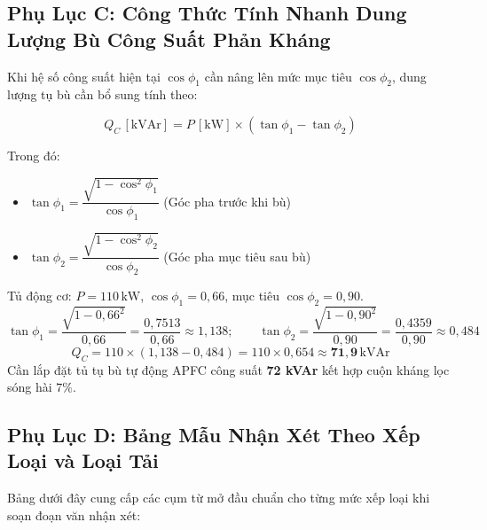 \documentclass[12pt,a4paper]{article}
\begin{document}
\subsection{Phụ Lục C: Công Thức Tính Nhanh Dung Lượng Bù Công Suất Phản Kháng}

Khi hệ số công suất hiện tại $\cos\phi_1$ cần nâng lên mức mục tiêu $\cos\phi_2$, dung lượng tụ bù cần bổ sung tính theo:

\begin{equation}
  Q_C\,[\mathrm{kVAr}] = P\,[\mathrm{kW}] \times \left(\tan\phi_1 - \tan\phi_2\right)
\end{equation}

Trong đó:
\begin{itemize}
  \item $\tan\phi_1 = \dfrac{\sqrt{1 - \cos^2\phi_1}}{\cos\phi_1}$ \quad (Góc pha trước khi bù)
  \item $\tan\phi_2 = \dfrac{\sqrt{1 - \cos^2\phi_2}}{\cos\phi_2}$ \quad (Góc pha mục tiêu sau bù)
\end{itemize}

\begin{techbox}[title=Ví Dụ Tính Bù Tụ Thực Tế]
Tủ động cơ: $P = 110\,\mathrm{kW}$, $\cos\phi_1 = 0{,}66$, mục tiêu $\cos\phi_2 = 0{,}90$.
\[
  \tan\phi_1 = \frac{\sqrt{1 - 0{,}66^2}}{0{,}66} = \frac{0{,}7513}{0{,}66} \approx 1{,}138; \qquad
  \tan\phi_2 = \frac{\sqrt{1 - 0{,}90^2}}{0{,}90} = \frac{0{,}4359}{0{,}90} \approx 0{,}484
\]
\[
  Q_C = 110 \times (1{,}138 - 0{,}484) = 110 \times 0{,}654 \approx \mathbf{71{,}9\,\mathrm{kVAr}}
\]
Cần lắp đặt tủ tụ bù tự động APFC công suất \textbf{72 kVAr} kết hợp cuộn kháng lọc sóng hài $7\%$.
\end{techbox}

\subsection{Phụ Lục D: Bảng Mẫu Nhận Xét Theo Xếp Loại và Loại Tải}

Bảng dưới đây cung cấp các cụm từ mở đầu chuẩn cho từng mức xếp loại khi soạn đoạn văn nhận xét:
\end{document}
